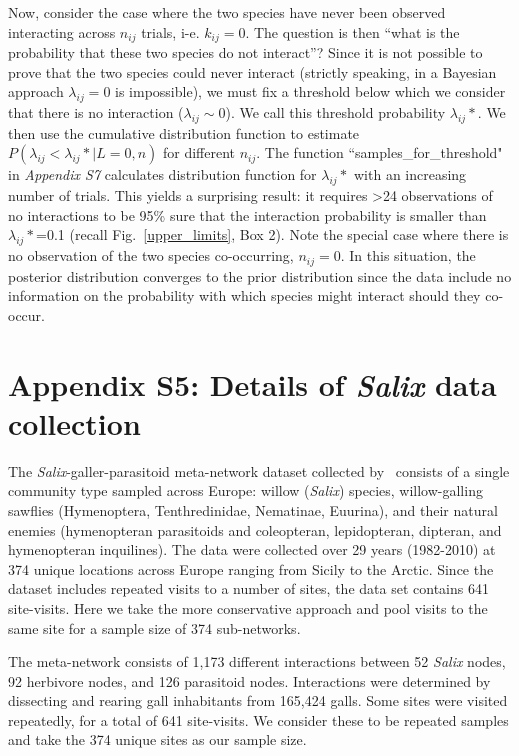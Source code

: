 \documentclass[12pt]{article}
\begin{document}
        Now, consider the case where the two species have never been observed interacting across $n_{ij}$ trials, i-e. $k_{ij}=0$. The question is then ``what is the probability that these two species do not interact''? Since it is not possible to prove that the two species could never interact (strictly speaking, in a Bayesian approach $\lambda_{ij}=0$ is impossible), we must fix a threshold below which we consider that there is no interaction ($\lambda_{ij}\sim0$). We call this threshold probability $\lambda_{ij}*$. We then use the cumulative distribution function to estimate $P(\lambda_{ij}<\lambda_{ij}*|L=0,n)$ for different $n_{ij}$. The function ``samples\_for\_threshold" in \emph{Appendix S7} calculates distribution function for $\lambda_{ij}*$ with an increasing number of trials. This yields a surprising result: it requires \textgreater24 observations of no interactions to be 95\% sure that the interaction probability is smaller than $\lambda_{ij}*$=0.1 (recall Fig.~\ref{upper_limits}, Box 2). Note the special case where there is no observation of the two species co-occurring, $n_{ij}= 0$.  In this situation, the posterior distribution converges to the prior distribution since the data include no information on the probability with which species might interact should they co-occur.

\clearpage

\section*{Appendix S5: Details of \emph{Salix} data collection}

      The \emph{Salix}-galler-parasitoid meta-network dataset collected 
      by~\citet{Kopelke2017} consists of a single community type sampled across 
      Europe: willow (\emph{Salix}) species, willow-galling sawflies (Hymenoptera, Tenthredinidae, Nematinae, Euurina), and their natural 
      enemies (hymenopteran parasitoids and coleopteran, lepidopteran, dipteran, 
      and hymenopteran inquilines). The data were collected over 29 years 
      (1982-2010) at 374 unique locations across Europe ranging from Sicily to 
      the Arctic. Since the dataset includes repeated visits to a number of sites, the data set 
      contains 641 site-visits. Here we take the more conservative approach and pool visits to the same site for a sample size of 374 sub-networks.

      The meta-network consists of 1,173 different interactions 
      between 52 \emph{Salix} nodes, 92 herbivore nodes, and 126 parasitoid 
      nodes. Interactions were determined by dissecting and rearing gall 
      inhabitants from 165,424 galls. Some sites were visited repeatedly, for a 
      total of 641 site-visits. We consider these to be repeated samples and 
      take the 374 unique sites as our sample size.
\end{document}

